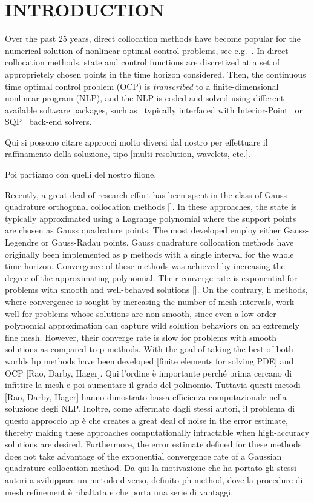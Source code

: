 \section*{INTRODUCTION}

Over the past 25 years, direct collocation methods have become popular for the numerical solution of nonlinear optimal control problems, see e.g.~\cite{Fahroo:JGCD:2002,Elnager:TAC:1995,Fahroo:JAS:2000,Gong:AAS:2006}. In direct collocation methods, state and control functions are discretized at a set of approprietely chosen points in the time horizon considered. Then, the continuous time optimal control problem (OCP) is \emph{transcribed} to a finite-dimensional nonlinear program (NLP), and the NLP is coded and solved using different available software packages, such as~\cite{casadi:MPC:2019, Rao:TMS:2010,GPOPSII:TMS:2013} typically interfaced with Interior-Point~\cite{Biegler:CCE:2009} or SQP~\cite{SNOPT:SIAMReview:2005} back-end solvers.

Qui si possono citare approcci molto diversi dal nostro per effettuare il raffinamento della soluzione, tipo [multi-resolution, wavelets, etc.].

Poi partiamo con quelli del nostro filone.

Recently, a great deal of research effort has been spent in the class of Gauss quadrature orthogonal collocation methods []. In these approaches, the state is typically approximated using a Lagrange polynomial where the support points are chosen as Gauss quadrature points. The most developed employ either Gauss-Legendre or Gauss-Radau points. Gauss quadrature collocation methods have originally been implemented as p methods with a single interval for the whole time horizon. Convergence of these methods was achieved by increasing the degree of the approximating polynomial. Their converge rate is exponential for problems with smooth and well-behaved solutions []. On the contrary, h methods, where convergence is sought by increasing the number of mesh intervals, work well for problems whose solutions are non smooth, since even a low-order polynomial approximation can capture wild solution behaviors on an extremely fine mesh. However, their converge rate is slow for problems with smooth solutions as compared to p methods.
With the goal of taking the best of both worlds hp methods have been developed [finite elements for solving PDE] and OCP [Rao, Darby, Hager]. Qui l'ordine è importante perché prima cercano di infittire la mesh e poi aumentare il grado del polinomio. Tuttavia questi metodi [Rao, Darby, Hager] hanno dimostrato bassa efficienza computazionale nella soluzione degli NLP. Inoltre, come affermato dagli stessi autori, il problema di questo approccio hp è che creates a great deal of noise in the error estimate, thereby making these approaches computationally intractable when high-accuracy solutions are desired. Furthermore, the error estimate defined for these methods does not take advantage of the exponential convergence rate of a Gaussian quadrature collocation method.
Da qui la motivazione che ha portato gli stessi autori a sviluppare un metodo diverso, definito ph method, dove la procedure di mesh refinement è ribaltata e che porta una serie di vantaggi.


